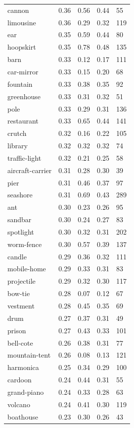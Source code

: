\begin{center}
\begin{longtable}{lllll}
cannon & 0.36 & 0.56 & 0.44 & 55 \\
limousine & 0.36 & 0.29 & 0.32 & 119 \\
ear & 0.35 & 0.59 & 0.44 & 80 \\
hoopskirt & 0.35 & 0.78 & 0.48 & 135 \\
barn & 0.33 & 0.12 & 0.17 & 111 \\
car-mirror & 0.33 & 0.15 & 0.20 & 68 \\
fountain & 0.33 & 0.38 & 0.35 & 92 \\
greenhouse & 0.33 & 0.31 & 0.32 & 51 \\
pole & 0.33 & 0.29 & 0.31 & 136 \\
restaurant & 0.33 & 0.65 & 0.44 & 141 \\
crutch & 0.32 & 0.16 & 0.22 & 105 \\
library & 0.32 & 0.32 & 0.32 & 74 \\
traffic-light & 0.32 & 0.21 & 0.25 & 58 \\
aircraft-carrier & 0.31 & 0.28 & 0.30 & 39 \\
pier & 0.31 & 0.46 & 0.37 & 97 \\
seashore & 0.31 & 0.69 & 0.43 & 289 \\
ant & 0.30 & 0.23 & 0.26 & 95 \\
sandbar & 0.30 & 0.24 & 0.27 & 83 \\
spotlight & 0.30 & 0.32 & 0.31 & 202 \\
worm-fence & 0.30 & 0.57 & 0.39 & 137 \\
candle & 0.29 & 0.36 & 0.32 & 111 \\
mobile-home & 0.29 & 0.33 & 0.31 & 83 \\
projectile & 0.29 & 0.32 & 0.30 & 117 \\
bow-tie & 0.28 & 0.07 & 0.12 & 67 \\
vestment & 0.28 & 0.45 & 0.35 & 69 \\
drum & 0.27 & 0.37 & 0.31 & 49 \\
prison & 0.27 & 0.43 & 0.33 & 101 \\
bell-cote & 0.26 & 0.38 & 0.31 & 77 \\
mountain-tent & 0.26 & 0.08 & 0.13 & 121 \\
harmonica & 0.25 & 0.34 & 0.29 & 100 \\
cardoon & 0.24 & 0.44 & 0.31 & 55 \\
grand-piano & 0.24 & 0.33 & 0.28 & 63 \\
volcano & 0.24 & 0.41 & 0.30 & 119 \\
boathouse & 0.23 & 0.30 & 0.26 & 43 \\

\end{longtable}
\end{center}

